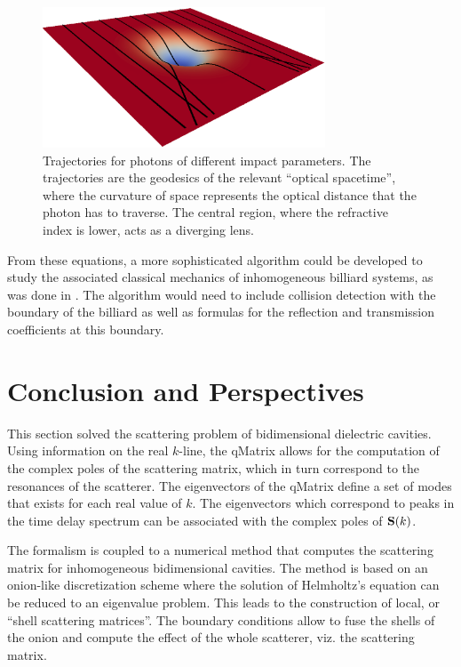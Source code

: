 \begin{figure}
 \centering
 \includegraphics[width=0.75\textwidth]{figs/passive/geodesics-1.eps}
 \caption[Photon trajectories in a Gaussian deformation of the refractive index]
	  {Trajectories for photons of different impact parameters. The trajectories are
	  the geodesics of the relevant ``optical spacetime'', where the curvature of 
	  space represents the optical distance that the photon has to traverse. The central
	  region, where the refractive index is lower, acts as a diverging lens.}
 \label{fig:passive.gaussian.geodesics}
\end{figure}

From these equations, a more sophisticated algorithm could be developed to study
the associated classical mechanics of inhomogeneous billiard systems, as was done
in \cite{SAI2005}. The algorithm would need to include collision detection with the 
boundary of the billiard as well as formulas for the reflection and transmission coefficients
at this boundary.

\section{Conclusion and Perspectives}
This section solved the scattering problem of bidimensional
dielectric cavities. Using information on the real $k$-line,
the \gls{qMatrix} allows for the computation of the complex poles
of the scattering matrix, which in turn correspond to the resonances
of the scatterer. The eigenvectors of the \gls{qMatrix} define 
a set of modes that exists for each real value of $k$. The eigenvectors
which correspond to peaks in the time delay spectrum can be associated
with the complex poles of $\mathbf{S}(k)$.

The formalism is coupled to a numerical method that computes 
the scattering matrix for inhomogeneous bidimensional cavities.
The method is based on an onion-like discretization scheme
where the solution of Helmholtz's equation can be reduced to an 
eigenvalue problem. This leads to the construction of local, or 
``shell scattering matrices''. The boundary conditions allow to fuse
the shells of the onion and compute the effect of the whole scatterer, 
viz. the scattering matrix.


